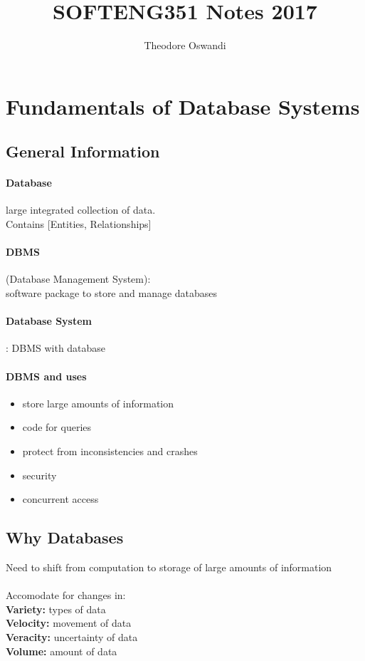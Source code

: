 \documentclass{article}
\title{SOFTENG351 Notes 2017}
\author{Theodore Oswandi}
\newcommand\tab[1][0.5cm]{\hspace*{#1}}
\begin{document}
 \maketitle{} 

\section{Fundamentals of Database Systems}
	\subsection{General Information}
		\paragraph{Database}
		large integrated collection of data. 
		\\ Contains [Entities, Relationships] 

		\paragraph{DBMS}(Database Management System): 
		\\ software package to store and manage databases

		\paragraph{Database System}: DBMS with database

		\paragraph{DBMS and uses}
		\begin{itemize}
			\item store large amounts of information
			\item code for queries
			\item protect from inconsistencies and crashes
			\item security
			\item concurrent access
		\end{itemize}

	\subsection{Why Databases}
		\tab Need to shift from computation to storage of large amounts of information
		\\ \\ \tab Accomodate for changes in:
		\\ \tab \textbf{Variety:} types of data
		\\ \tab \textbf{Velocity:} movement of data
		\\ \tab \textbf{Veracity:} uncertainty of data
		\\ \tab \textbf{Volume:} amount of data
\end{document}
